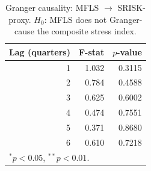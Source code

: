 \begin{table}[h]
\centering
\caption{Granger causality: MFLS $\to$ SRISK-proxy. $H_0$: MFLS does not Granger-cause the composite stress index.}
\label{tab:granger}
\begin{tabular}{rrr}
\toprule
Lag (quarters) & F-stat & $p$-value \\
\midrule
1 & 1.032 & 0.3115 \\
2 & 0.784 & 0.4588 \\
3 & 0.625 & 0.6002 \\
4 & 0.474 & 0.7551 \\
5 & 0.371 & 0.8680 \\
6 & 0.610 & 0.7218 \\
\midrule
\multicolumn{3}{l}{\footnotesize $^{*}p<0.05$, $^{**}p<0.01$.} \\
\bottomrule
\end{tabular}
\end{table}